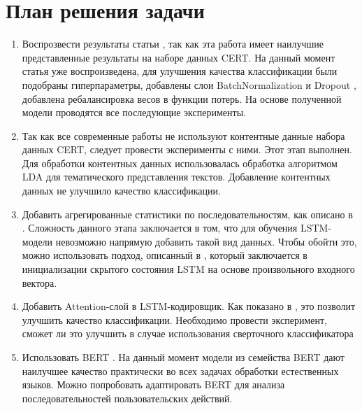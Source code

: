 \chapter{План решения задачи}

\begin{enumerate}
    \item Воспрозвести результаты статьи \cite{yuanInsiderThreatDetection2018b}, так как эта работа имеет наилучшие представленные результаты на наборе данных CERT. На данный момент статья уже воспроизведена, для улучшения качества классификации были подобраны гиперпараметры, добавлены слои BatchNormalization \cite{ioffeBatchNormalizationAccelerating2015} и Dropout \cite{srivastavaDropoutSimpleWay}, добавлена ребалансировка весов в функции потерь. На основе полученной модели проводятся все последующие эксперименты.
    \item Так как все современные работы не используют контентные данные набора данных CERT, следует провести эксперименты с ними. Этот этап выполнен. Для обработки контентных данных использовалась обработка алгоритмом LDA для тематического представления текстов. Добавление контентных данных не улучшило качество классификации.
    \item Добавить агрегированные статистики по последовательностям, как описано в \cite{leEvaluatingInsiderThreat2018}. Сложность данного этапа заключается в том, что для обучения LSTM-модели невозможно напрямую добавить такой вид данных. Чтобы обойти это, можно использовать подход, описанный в \cite{karpathyDeepVisualSemanticAlignments2015}, который заключается в инициализации скрытого состояния LSTM на основе произвольного входного вектора.
    \item Добавить Attention-слой в LSTM-кодировщик. Как показано в \cite{yuanInsiderThreatDetection2018b}, это позволит улучшить качество классификации. Необходимо провести эксперимент, сможет ли это улучшить в случае использования сверточного классификатора
    \item Использовать BERT \cite{devlinBERTPretrainingDeep2019}. На данный момент модели из семейства BERT дают наилучшее качество практически во всех задачах обработки естественных языков. Можно попробовать адаптировать BERT для анализа последовательностей пользовательских действий.
\end{enumerate}